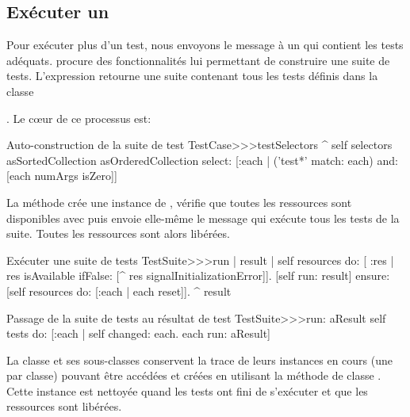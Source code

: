 \documentclass[a4paper,10pt,twoside]{book}
\begin{document}
\subsection{Exécuter un }
Pour exécuter plus d'un test, nous envoyons le message  à un  qui contient 
les tests adéquats.  procure des fonctionnalités lui permettant de construire  
une suite de tests. L'expression  retourne une suite 
contenant tous les tests définis dans la classe {. Le c{\oe}ur de ce processus est:

\begin{method}[testcasetestselectors]{Auto-construction de la suite de test}
TestCase>>>testSelectors 
	^ self selectors asSortedCollection asOrderedCollection select: [:each | 
		('test*' match: each) and: [each numArgs isZero]]
\end{method}

La méthode  crée une instance de , vérifie que toutes les 
ressources sont disponibles avec  puis envoie elle-même le 
message  qui exécute tous les tests de la suite. 
Toutes les ressources sont alors libérées.

\begin{method}[testsuiterun]{Exécuter une suite de tests}
TestSuite>>>run
	| result |
  self resources do: [ :res |
		res isAvailable ifFalse: [^ res signalInitializationError]].
	[self run: result] ensure: [self resources do: [:each | each reset]].
	^ result
\end{method}


\begin{method}[testsuiterun:]{Passage de la suite de tests au résultat de test}
TestSuite>>>run: aResult
	self tests do: [:each |
	  self changed: each.
	  each run: aResult]
\end{method}
La classe  et ses sous-classes conservent la trace de leurs instances 
en cours (une par classe) pouvant être accédées et créées en utilisant la méthode de 
classe . Cette instance est nettoyée quand les tests 
ont fini de s'exécuter et que les ressources sont libérées.


}
\end{document}
